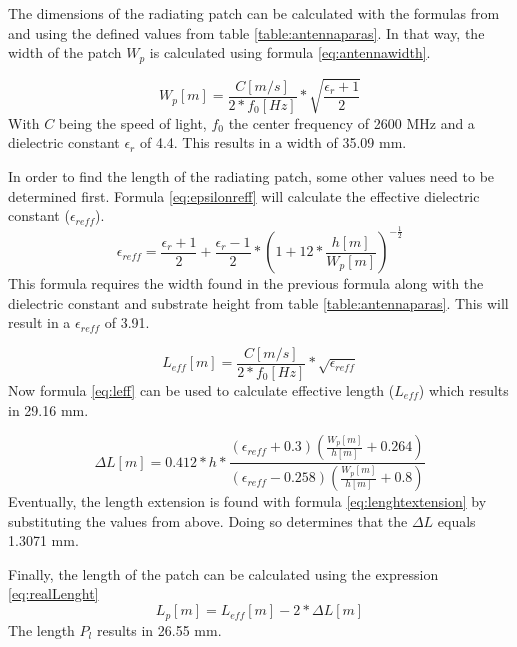 The dimensions of the radiating patch can be calculated with the formulas from \cite{J14_antennadesign} and \cite{J15_antennadesign}
using the defined values from table \ref{table:antennaparas}. In that way, the width of the patch $W_{p}$ is calculated using formula \ref{eq:antennawidth}.

\begin{equation} 
W_{p} [m] = \frac{C [m/s]}{2*f_0 [Hz]}*\sqrt{\frac{\epsilon_r+1}{2}}
\label{eq:antennawidth}
\end{equation}
With $C$ being the speed of light, $f_0$ the center frequency of 2600 MHz and a dielectric constant $\epsilon_r$ of 4.4. This results 
in a width of 35.09 mm.

In order to find the length of the radiating patch, some other values need to be determined first. Formula \ref{eq:epsilonreff} will
calculate the effective dielectric constant ($\epsilon_{reff}$).
\begin{equation} 
\epsilon_{reff} = \frac{\epsilon_r+1}{2}+  \frac{\epsilon_r-1}{2} * \left(1+12*\frac{h [m]}{W_{p} [m] }\right)^{-\frac{1}{2}}
\label{eq:epsilonreff}
\end{equation}
This formula requires the width found in the previous formula along with the dielectric constant and substrate height from table \ref{table:antennaparas}.
This will result in a $\epsilon_{reff}$ of 3.91.

\begin{equation} 
L_{eff} [m] = \frac{C [m/s]}{2*f_0 [Hz]}*\sqrt{\epsilon_{reff}}
\label{eq:leff}
\end{equation}
Now formula \ref{eq:leff} can be used to calculate effective length ($L_{eff}$) which results in 29.16 mm.

\begin{equation} 
\Delta L [m]= 0.412*h*\frac{(\epsilon_{reff}+0.3)\left(\frac{W_{p} [m]}{h [m]}+0.264\right)}{\left(\epsilon_{reff}-0.258\right)\left(\frac{W_{p} [m]}{h [m]}+0.8\right)}
\label{eq:lenghtextension}
\end{equation}
Eventually, the length extension is found with formula \ref{eq:lenghtextension} by substituting the values from above.
Doing so determines that the $\Delta L$ equals 1.3071 mm.

Finally, the length of the patch can be calculated using the expression \ref{eq:realLenght}
\begin{equation} 
L_p [m]= L_{eff} [m] - 2 * \Delta L [m]
\label{eq:realLenght}
\end{equation}
The length $P_l$ results in 26.55 mm.

